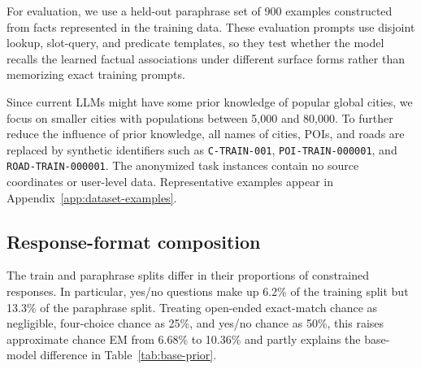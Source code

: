 \documentclass[11pt]{article}
\begin{document}
For evaluation, we use a held-out paraphrase set of 900 examples constructed from
facts represented in the training data. These evaluation prompts use disjoint lookup,
slot-query, and predicate templates, so they test whether the model recalls the
learned factual associations under different surface forms rather than
memorizing exact training prompts.

Since current LLMs might have some prior knowledge of popular global cities,
we focus on smaller cities with populations between 5,000 and 80,000. To further
reduce the influence of prior knowledge, all names of cities, POIs, and roads are
replaced by synthetic identifiers such as
\texttt{C-TRAIN-001}, \texttt{POI-TRAIN-000001}, and \texttt{ROAD-TRAIN-000001}.
The anonymized task instances contain no source coordinates or user-level data.
Representative examples appear in Appendix~\ref{app:dataset-examples}.

\subsection{Response-format composition}
\label{app:response-formats}
The train and paraphrase splits differ in their proportions of constrained
responses. In particular, yes/no questions make up 6.2\% of the training split
but 13.3\% of the paraphrase split. Treating open-ended exact-match chance as
negligible, four-choice chance as 25\%, and yes/no chance as 50\%, this raises
approximate chance EM from 6.68\% to 10.36\% and partly explains the base-model
difference in Table~\ref{tab:base-prior}.
\end{document}
